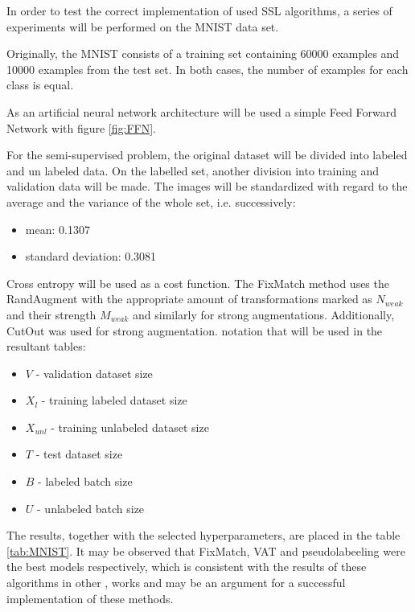 \documentclass[12pt]{article}
\theoremstyle{definition}
\DeclareRobustCommand{\[}{\begin{equation}}
\DeclareRobustCommand{\]}{\end{equation}}
\begin{document}
\begin{minipage}{0.6\linewidth}
In order to test the correct implementation of used SSL algorithms, a series of experiments will be performed on the MNIST data set. \cite{lecun-mnisthandwrittendigit-2010}\par 
Originally, the MNIST consists of a training set containing 60000 examples and 10000 examples from the test set. In both cases, the number of examples for each class is equal.\par

As an artificial neural network architecture will be used a simple Feed Forward Network with figure \ref{fig:FFN}.

For the semi-supervised problem, the original dataset will be divided into labeled and un labeled data. On the labelled set, another division into training and validation data will be made. \newline
The images will be standardized with regard to the average and the variance of the whole set, i.e. successively:
    \begin{itemize}
        \item mean: 0.1307
        \item standard deviation: 0.3081
    \end{itemize}
    \newline
Cross entropy will be used as a cost function.
The FixMatch method uses the RandAugment \cite{RandAugment} with the appropriate amount of transformations marked as $N_{weak}$ and their strength $M_{weak}$ and similarly for strong augmentations. Additionally, CutOut \cite{Cutout} was used for strong augmentation.
\The notation that will be used in the resultant tables:
\begin{itemize}
    \item $V$ - validation dataset size
    \item $X_l$ - training labeled dataset size
    \item $X_{unl}$ - training unlabeled dataset size
    \item $T$ - test dataset size
    \item $B$ - labeled batch size
    \item $U$ - unlabeled batch size
\end{itemize}
\end{minipage}
\newpage
The results, together with the selected hyperparameters, are placed in the table \ref{tab:MNIST}.
It may be observed that FixMatch, VAT and pseudolabeeling were the best models respectively, which is consistent with the results of these algorithms in other \cite{Realistic}, \cite{FixMatch} works and may be an argument for a successful implementation of these methods.
\end{document}
